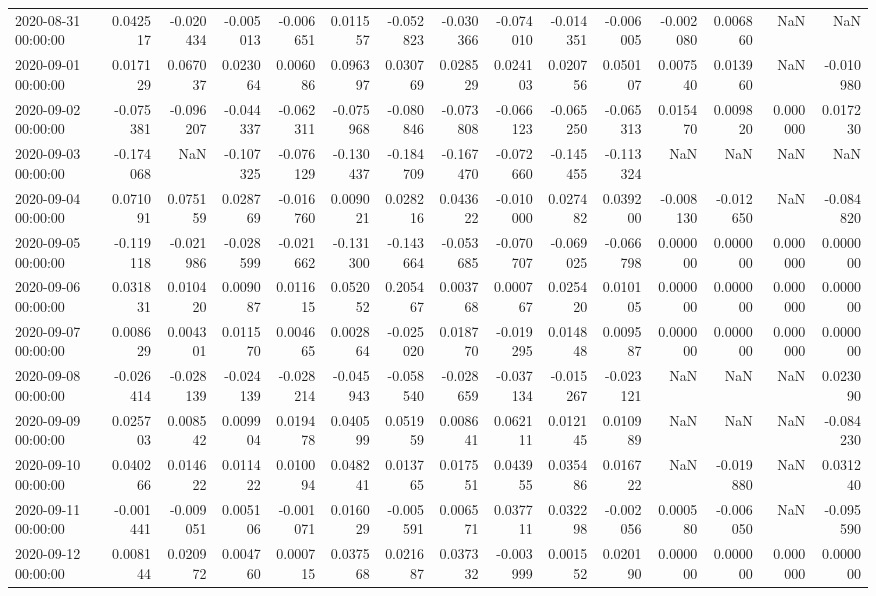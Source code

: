 \begin{tabular}{lrrrrrrrrrrrrrr}
2020-08-31 00:00:00 & 0.042517 & -0.020434 & -0.005013 & -0.006651 & 0.011557 & -0.052823 & -0.030366 & -0.074010 & -0.014351 & -0.006005 & -0.002080 & 0.006860 & NaN & NaN \\
2020-09-01 00:00:00 & 0.017129 & 0.067037 & 0.023064 & 0.006086 & 0.096397 & 0.030769 & 0.028529 & 0.024103 & 0.020756 & 0.050107 & 0.007540 & 0.013960 & NaN & -0.010980 \\
2020-09-02 00:00:00 & -0.075381 & -0.096207 & -0.044337 & -0.062311 & -0.075968 & -0.080846 & -0.073808 & -0.066123 & -0.065250 & -0.065313 & 0.015470 & 0.009820 & 0.000000 & 0.017230 \\
2020-09-03 00:00:00 & -0.174068 & NaN & -0.107325 & -0.076129 & -0.130437 & -0.184709 & -0.167470 & -0.072660 & -0.145455 & -0.113324 & NaN & NaN & NaN & NaN \\
2020-09-04 00:00:00 & 0.071091 & 0.075159 & 0.028769 & -0.016760 & 0.009021 & 0.028216 & 0.043622 & -0.010000 & 0.027482 & 0.039200 & -0.008130 & -0.012650 & NaN & -0.084820 \\
2020-09-05 00:00:00 & -0.119118 & -0.021986 & -0.028599 & -0.021662 & -0.131300 & -0.143664 & -0.053685 & -0.070707 & -0.069025 & -0.066798 & 0.000000 & 0.000000 & 0.000000 & 0.000000 \\
2020-09-06 00:00:00 & 0.031831 & 0.010420 & 0.009087 & 0.011615 & 0.052052 & 0.205467 & 0.003768 & 0.000767 & 0.025420 & 0.010105 & 0.000000 & 0.000000 & 0.000000 & 0.000000 \\
2020-09-07 00:00:00 & 0.008629 & 0.004301 & 0.011570 & 0.004665 & 0.002864 & -0.025020 & 0.018770 & -0.019295 & 0.014848 & 0.009587 & 0.000000 & 0.000000 & 0.000000 & 0.000000 \\
2020-09-08 00:00:00 & -0.026414 & -0.028139 & -0.024139 & -0.028214 & -0.045943 & -0.058540 & -0.028659 & -0.037134 & -0.015267 & -0.023121 & NaN & NaN & NaN & 0.023090 \\
2020-09-09 00:00:00 & 0.025703 & 0.008542 & 0.009904 & 0.019478 & 0.040599 & 0.051959 & 0.008641 & 0.062111 & 0.012145 & 0.010989 & NaN & NaN & NaN & -0.084230 \\
2020-09-10 00:00:00 & 0.040266 & 0.014622 & 0.011422 & 0.010094 & 0.048241 & 0.013765 & 0.017551 & 0.043955 & 0.035486 & 0.016722 & NaN & -0.019880 & NaN & 0.031240 \\
2020-09-11 00:00:00 & -0.001441 & -0.009051 & 0.005106 & -0.001071 & 0.016029 & -0.005591 & 0.006571 & 0.037711 & 0.032298 & -0.002056 & 0.000580 & -0.006050 & NaN & -0.095590 \\
2020-09-12 00:00:00 & 0.008144 & 0.020972 & 0.004760 & 0.000715 & 0.037568 & 0.021687 & 0.037332 & -0.003999 & 0.001552 & 0.020190 & 0.000000 & 0.000000 & 0.000000 & 0.000000 \\

\end{tabular}
